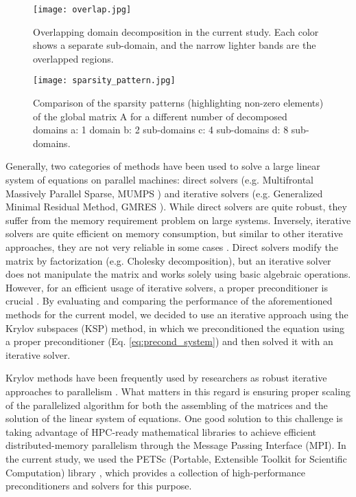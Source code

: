 \begin{figure}[h]
\centering
\medskip
\texttt{[image: overlap.jpg]}
\caption[Overlapping domain decomposition ]{Overlapping domain decomposition in the current study. Each color shows a separate sub-domain, and the narrow lighter bands are the overlapped regions.} \label{fig:overlap}
\end{figure}


\begin{figure}[h]
\centering
\medskip
\texttt{[image: sparsity\_pattern.jpg]}
\caption[Comparison of the sparsity patterns of the global matrix A]{Comparison of the sparsity patterns (highlighting non-zero elements) of the global matrix A for a different number of decomposed domains a: 1 domain b: 2 sub-domains c: 4 sub-domains d: 8 sub-domains.} \label{fig:sparsity_pattern}
\end{figure}


Generally, two categories of methods have been used to solve a large linear system of equations on parallel machines: direct solvers (e.g. Multifrontal Massively Parallel Sparse, MUMPS \cite{MUMPS1}) and iterative solvers (e.g. Generalized Minimal Residual Method, {GMRES} \cite{Saad1986}). While direct solvers are quite robust, they suffer from the memory requirement problem on large systems. Inversely, iterative solvers are quite efficient on memory consumption, but similar to other iterative approaches, they are not very reliable in some cases \cite{Saad2003}. Direct solvers modify the matrix by factorization (e.g. Cholesky decomposition), but an iterative solver does not manipulate the matrix and works solely using basic algebraic operations. However, for an efficient usage of iterative solvers, a proper preconditioner is crucial \cite{Saad2003}. By evaluating and comparing the performance of the aforementioned methods for the current model, we decided to use an iterative approach using the Krylov subspaces ({KSP}) method, in which we preconditioned the equation using a proper preconditioner (Eq. \ref{eq:precond_system}) and then solved it with an iterative solver.

Krylov methods have been frequently used by researchers as robust iterative approaches to parallelism \cite{Ipsen1998}. What matters in this regard is ensuring proper scaling of the parallelized algorithm for both the assembling of the matrices and the solution of the linear system of equations. One good solution to this challenge is taking advantage of {HPC}-ready mathematical libraries to achieve efficient distributed-memory parallelism through the Message Passing Interface ({MPI}). In the current study, we used the {PETSc} (Portable, Extensible Toolkit for Scientific Computation) library \cite{petsc}, which provides a collection of high-performance preconditioners and solvers for this purpose.


